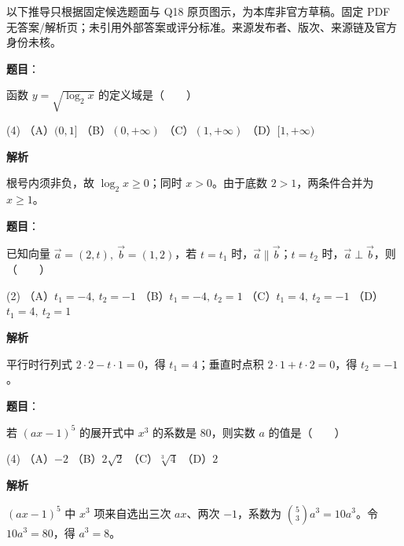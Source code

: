 

\begin{gktip}
以下推导只根据固定候选题面与 Q18 原页图示，为本库非官方草稿。固定 PDF 无答案/解析页；未引用外部答案或评分标准。来源发布者、版次、来源链及官方身份未核。
\end{gktip}

\begin{answer}

\textbf{题目}：

函数 $y=\sqrt{\log_2 x}$ 的定义域是\mbox{（　　）}

\begin{gkopts}(4)
\task （A）$(0,1]$
\task （B）$(0,+\infty)$
\task （C）$(1,+\infty)$
\task （D）$[1,+\infty)$
\end{gkopts}

\textbf{解析}

根号内须非负，故 $\log_2x\geqslant0$；同时 $x>0$。由于底数 $2>1$，两条件合并为 $x\geqslant1$。

\gkanswer{答案：D，$[1,+\infty)$。}

\end{answer}
\begin{answer}

\textbf{题目}：

已知向量 $\vec a=(2,t),\ \vec b=(1,2)$，若 $t=t_1$ 时，$\vec a\parallel\vec b$；$t=t_2$ 时，$\vec a\perp\vec b$，则\mbox{（　　）}

\begin{gkopts}(2)
\task （A）$t_1=-4,\ t_2=-1$
\task （B）$t_1=-4,\ t_2=1$
\task （C）$t_1=4,\ t_2=-1$
\task （D）$t_1=4,\ t_2=1$
\end{gkopts}

\textbf{解析}

平行时行列式 $2\cdot2-t\cdot1=0$，得 $t_1=4$；垂直时点积 $2\cdot1+t\cdot2=0$，得 $t_2=-1$。


\end{answer}
\begin{answer}

\textbf{题目}：

若 $(ax-1)^5$ 的展开式中 $x^3$ 的系数是 80，则实数 $a$ 的值是\mbox{（　　）}

\begin{gkopts}(4)
\task （A）$-2$
\task （B）$2\sqrt2$
\task （C）$\sqrt[3]{4}$
\task （D）$2$
\end{gkopts}

\textbf{解析}

$(ax-1)^5$ 中 $x^3$ 项来自选出三次 $ax$、两次 $-1$，系数为 $\binom53a^3=10a^3$。令 $10a^3=80$，得 $a^3=8$。


\end{answer}
